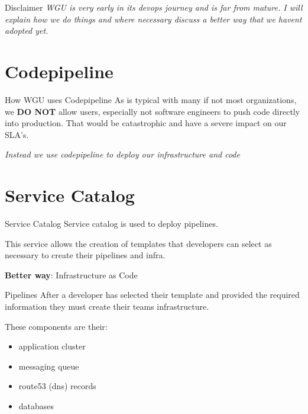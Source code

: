\documentclass{beamer}
\begin{document}
    \begin{frame}{Disclaimer}
      \textit{WGU is very early in its devops journey and is far from mature.
      I will explain how we do things and where necessary discuss a better way
      that we havent adopted yet.}
    \end{frame}


  \section{Codepipeline}

    \begin{frame}{How WGU uses Codepipeline}
      As is typical with many if not most organizations, we \textbf{DO NOT} 
      allow users, especially not software engineers to push code directly 
      into production. That would be catastrophic and have a severe impact
      on our SLA's.

      \vfill
      \textit{Instead we use codepipeline to deploy our infrastructure and code}
    \end{frame}

  \section{Service Catalog}
    \begin{frame}{Service Catalog}
      Service catalog is used to deploy pipelines.

      This service allows the creation of templates that developers can
      select as necessary to create their pipelines and infra.

      \vfill
      \textbf{Better way}: Infrastructure as Code
    \end{frame}

    \begin{frame}{Pipelines}
      After a developer has selected their template and provided the
      required information they must create their teams infrastructure.

      These components are their:
      \begin{itemize}
        \item application cluster
        \item messaging queue
        \item route53 (dns) records
        \item databases
      \end{itemize}
    \end{frame}
\end{document}

